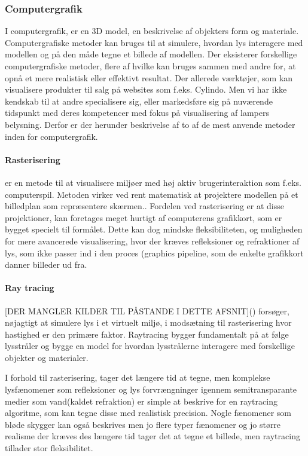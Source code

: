 \subsubsection{Computergrafik}
\label{sec:computergrafik}
I computergrafik, er en 3D model, en beskrivelse af objekters form og materiale.\cite{computergrafik_introduktion} Computergrafiske metoder kan bruges til at simulere, hvordan lys interagere med modellen og på den måde tegne et billede af modellen. Der eksisterer forskellige computergrafiske metoder, flere af hvilke kan bruges sammen med andre for, at opnå et mere realistisk eller effektivt resultat. Der allerede værktøjer, som kan visualisere produkter til salg på websites som f.eks. Cylindo\cite{Cylindo}. Men vi har ikke kendskab til at andre specialisere sig, eller markedsføre sig på nuværende tidspunkt med deres kompetencer med fokus på visualisering af lampers belysning. Derfor er der herunder beskrivelse af to af de mest anvende metoder inden for computergrafik.

\paragraph{Rasterisering}
er en metode til at visualisere miljøer med høj aktiv brugerinteraktion som f.eks. computerspil.\cite{rastarization} Metoden virker ved rent matematisk at projektere modellen på et billedplan som repræsentere skærmen.\cite{rastarization}. Fordelen ved rasterisering er at disse projektioner, kan foretages meget hurtigt af computerens grafikkort, som er bygget specielt til formålet\cite{rastarization}. Dette kan dog mindske fleksibiliteten, og muligheden for mere avancerede visualisering, hvor der kræves refleksioner og refraktioner af lys, som ikke passer ind i den proces (graphics pipeline\cite{rastarization}, som de enkelte grafikkort danner billeder ud fra. 

\paragraph{Ray tracing}\cite{raytracing_for_begyndere} [DER MANGLER KILDER TIL PÅSTANDE I DETTE AFSNIT]() forsøger, nøjagtigt at simulere lys i et virtuelt miljø, i modsætning til rasterisering hvor hastighed er den primære faktor. Raytracing bygger fundamentalt på at følge lysstråler og bygge en model for hvordan lysstrålerne interagere med forskellige objekter og materialer. 

I forhold til rasterisering, tager det længere tid at tegne, men komplekse lysfænomener som refleksioner og lys forvrængninger igennem semitransparante medier som vand(kaldet refraktion) er simple at beskrive for en raytracing algoritme, som kan tegne disse med realistisk precision. Nogle fænomener som bløde skygger kan også beskrives men jo flere typer fænomener og jo større realisme der kræves des længere tid tager det at tegne et billede, men raytracing tillader stor fleksibilitet.
